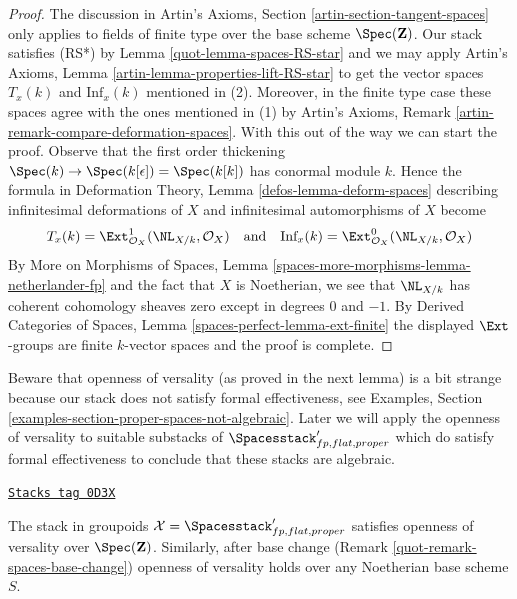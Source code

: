 \begin{proof}

The discussion in Artin's Axioms, Section \ref{artin-section-tangent-spaces}
only applies to fields of finite type over the base scheme $\Spec(\mathbf{Z})$.
Our stack satisfies (RS*) by Lemma \ref{quot-lemma-spaces-RS-star}
and we may apply
Artin's Axioms, Lemma \ref{artin-lemma-properties-lift-RS-star}
to get the vector spaces $T_x(k)$ and $\text{Inf}_x(k)$
mentioned in (2). Moreover, in the finite type case these spaces agree with the
ones mentioned in (1)
by Artin's Axioms, Remark \ref{artin-remark-compare-deformation-spaces}.
With this out of the way we can start the proof.
Observe that the first order thickening
$\Spec(k) \to \Spec(k[\epsilon]) = \Spec(k[k])$
has conormal module $k$. Hence the formula in
Deformation Theory, Lemma \ref{defos-lemma-deform-spaces}
describing infinitesimal deformations of $X$ and infinitesimal
automorphisms of $X$ become
$$
T_x(k) = \Ext^1_{\mathcal{O}_X}(\NL_{X/k}, \mathcal{O}_X)
\quad\text{and}\quad
\text{Inf}_x(k) = \Ext^0_{\mathcal{O}_X}(\NL_{X/k}, \mathcal{O}_X)
$$
By More on Morphisms of Spaces, Lemma
\ref{spaces-more-morphisms-lemma-netherlander-fp}
and the fact that $X$ is Noetherian, we see that
$\NL_{X/k}$ has coherent cohomology sheaves zero except
in degrees $0$ and $-1$.
By Derived Categories of Spaces, Lemma \ref{spaces-perfect-lemma-ext-finite}
the displayed $\Ext$-groups are finite $k$-vector spaces
and the proof is complete.
\end{proof}

Beware that openness of versality (as proved in the next lemma)
is a bit strange because our stack does not satisfy formal effectiveness, see
Examples, Section \ref{examples-section-proper-spaces-not-algebraic}.
Later we will apply the openness of versality to suitable substacks of
$\Spacesstack'_{fp, flat, proper}$ which do satisfy
formal effectiveness to conclude that these stacks are algebraic.

\begin{lemma}
\label{quot-lemma-spaces-defo-thy}
\href{https://stacks.math.columbia.edu/tag/0D3X}{\texttt{Stacks tag 0D3X}}

The stack in groupoids $\mathcal{X} = \Spacesstack'_{fp, flat, proper}$
satisfies openness of versality over $\Spec(\mathbf{Z})$.
Similarly, after base change (Remark \ref{quot-remark-spaces-base-change})
openness of versality holds over any Noetherian base scheme $S$.
\end{lemma}

